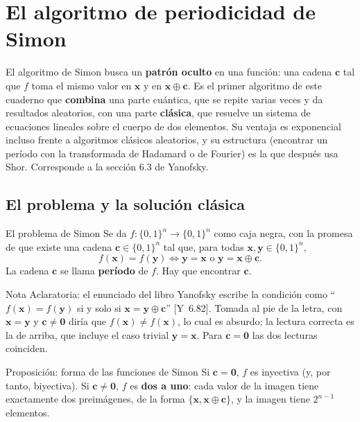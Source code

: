 \documentclass[11pt, a4paper, twoside, openright]{report}
\newcommand{\bx}{\mathbf{x}}
\newcommand{\by}{\mathbf{y}}
\newcommand{\bc}{\mathbf{c}}
\newcommand{\bcero}{\mathbf{0}}
\newcommand{\bits}[1]{\{0,1\}^{#1}}
\newcommand{\Yan}[1]{\textcolor{rosaviejo}{\small[Y~#1]}}  %
\begin{document}
\chapter{El algoritmo de periodicidad de Simon}

\noindent El algoritmo de Simon \cite{simon1997} busca un \textbf{patrón oculto} en una función: una cadena $\bc$ tal que $f$ toma el mismo valor en $\bx$ y en $\bx\oplus\bc$. Es el primer algoritmo de este cuaderno que \textbf{combina} una parte cuántica, que se repite varias veces y da resultados aleatorios, con una parte \textbf{clásica}, que resuelve un sistema de ecuaciones lineales sobre el cuerpo de dos elementos. Su ventaja es exponencial incluso frente a algoritmos clásicos aleatorios, y su estructura (encontrar un período con la transformada de Hadamard o de Fourier) es la que después usa Shor. Corresponde a la sección 6.3 de Yanofsky.

\cleardoublepage
\section{El problema y la solución clásica}

\begin{teoria}{El problema de Simon}
Se da $f:\bits{n}\to\bits{n}$ como caja negra, con la promesa de que existe una cadena $\bc\in\bits{n}$ tal que, para todas $\bx, \by\in\bits{n}$,
\[ f(\bx) = f(\by) \iff \by = \bx \text{ o } \by = \bx\oplus\bc. \]
La cadena $\bc$ se llama \textbf{período} de $f$. Hay que encontrar $\bc$.
\end{teoria}

\begin{aclaracion}{Nota Aclaratoria: el enunciado del libro}
Yanofsky escribe la condición como ``$f(\bx) = f(\by)$ si y solo si $\bx = \by\oplus\bc$'' \Yan{6.82}. Tomada al pie de la letra, con $\bx = \by$ y $\bc\neq\bcero$ diría que $f(\bx)\neq f(\bx)$, lo cual es absurdo; la lectura correcta es la de arriba, que incluye el caso trivial $\by = \bx$. Para $\bc = \bcero$ las dos lecturas coinciden.
\end{aclaracion}

\begin{teoria}{Proposición: forma de las funciones de Simon}
Si $\bc = \bcero$, $f$ es inyectiva (y, por tanto, biyectiva). Si $\bc\neq\bcero$, $f$ es \textbf{dos a uno}: cada valor de la imagen tiene exactamente dos preimágenes, de la forma $\{\bx, \bx\oplus\bc\}$, y la imagen tiene $2^{n-1}$ elementos.
\end{teoria}
\end{document}
